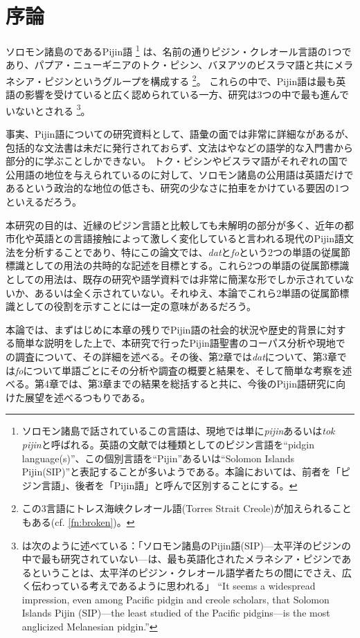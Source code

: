 \chapter{序論}

ソロモン諸島のであるPijin語
\footnote{
ソロモン諸島で話されているこの言語は、現地では単に\textit{pijin}あるいは\textit{tok pijin}と呼ばれる。英語の文献では種類としてのピジン言語を``pidgin language(s)''、この個別言語を``Pijin''あるいは``Solomon Islands Pijin(SIP)''と表記することが多いようである。本論においては、前者を「ピジン言語」、後者を「Pijin語」と呼んで区別することにする。}
は、名前の通りピジン・クレオール言語の1つであり、パプア・ニューギニアのトク・ピシン、バヌアツのビスラマ語と共にメラネシア・ピジンというグループを構成する
\footnote{
この3言語にトレス海峡クレオール語(Torres Strait Creole)が加えられることもある(cf. \ref{fn:broken})。
}。
これらの中で、Pijin語は最も英語の影響を受けていると広く認められている一方、研究は3つの中で最も進んでいないとされる
\footnote{
\citet{nativization}は次のように述べている：「ソロモン諸島のPijin語(SIP)---太平洋のピジンの中で最も研究されていない---は、最も英語化されたメラネシア・ピジンであるということは、太平洋のピジン・クレオール語学者たちの間にでさえ、広く伝わっている考えであるように思われる」
  ``It seems a widespread impression, even among Pacific pidgin and creole scholars, that Solomon Islands Pijin (SIP)---the least studied of the Pacific pidgins---is the most anglicized Melanesian pidgin.''
}。

事実、Pijin語についての研究資料として、語彙の面では非常に詳細な\cite{dictionary}があるが、包括的な文法書は未だに発行されておらず\citep{phonology}、文法は\cite{yumi}や\cite{eric}などの語学的な入門書から部分的に学ぶことしかできない。
トク・ピシンやビスラマ語がそれぞれの国で公用語の地位を与えられているのに対して、ソロモン諸島の公用語は英語だけであるという政治的な地位の低さも、研究の少なさに拍車をかけている要因の1つといえるだろう。

本研究の目的は、近縁のピジン言語と比較しても未解明の部分が多く、近年の都市化や英語との言語接触によって激しく変化していると言われる現代のPijin語文法を分析することであり、特にこの論文では、\textit{dat}と\textit{fo}という2つの単語の従属節標識としての用法の共時的な記述を目標とする。これら2つの単語の従属節標識としての用法は、既存の研究や語学資料では非常に簡潔な形でしか示されていないか、あるいは全く示されていない。それゆえ、本論でこれら2単語の従属節標識としての役割を示すことには一定の意味があるだろう。

本論では、まずはじめに本章の残りでPijin語の社会的状況や歴史的背景に対する簡単な説明をした上で、本研究で行ったPijin語聖書のコーパス分析や現地での調査について、その詳細を述べる。その後、第2章では\textit{dat}について、第3章では\textit{fo}について単語ごとにその分析や調査の概要と結果を、そして簡単な考察を述べる。第4章では、第3章までの結果を総括すると共に、今後のPijin語研究に向けた展望を述べるつもりである。

